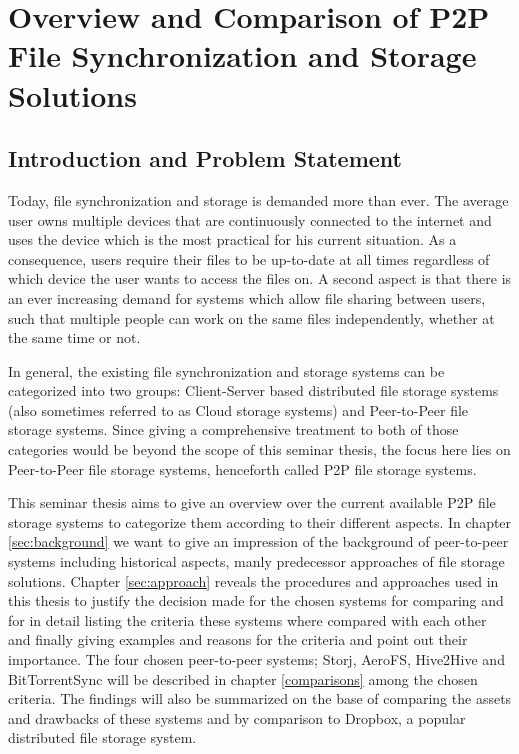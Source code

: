 \chapter{Overview and Comparison of P2P File Synchronization and Storage Solutions}


\newpage

\minitoc

\newpage

\section{Introduction and Problem Statement}
Today, file synchronization and storage is demanded more than ever. The average user owns multiple devices that are continuously connected to the internet and uses the device which is the most practical for his current situation. As a consequence, users require their files to be up-to-date at all times regardless of which device the user wants to access the files on. A second aspect is that there is an ever increasing demand for systems which allow file sharing between users, such that multiple people can work on the same files independently, whether at the same time or not.

In general, the existing file synchronization and storage systems can be categorized into two groups: Client-Server based distributed file storage systems (also sometimes referred to as Cloud storage systems) and Peer-to-Peer file storage systems. Since giving a comprehensive treatment to both of those categories would be beyond the scope of this seminar thesis, the focus here lies on Peer-to-Peer file storage systems, henceforth called P2P file storage systems.

This seminar thesis aims to give an overview over the current available P2P file storage systems to categorize them according to their different aspects. In chapter \ref{sec:background} we want to give an impression of the background of peer-to-peer systems including historical aspects, manly predecessor approaches of file storage solutions. Chapter \ref{sec:approach} reveals the procedures and approaches used in this thesis to justify the decision made for the chosen systems for comparing and for in detail listing the criteria these systems where compared with each other and finally giving examples and reasons for the criteria and point out their importance. The four chosen peer-to-peer systems; Storj, AeroFS, Hive2Hive and BitTorrentSync will be described in chapter \ref{comparisons} among the chosen criteria. The findings will also be summarized on the base of comparing the assets and drawbacks of these systems and by comparison to Dropbox, a popular distributed file storage system.

